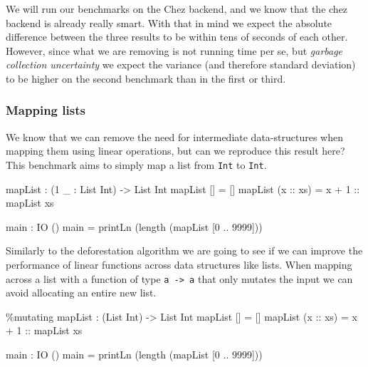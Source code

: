 \documentclass[
]{article}
\newenvironment{Shaded}{}{}
\newcommand{\DataTypeTok}[1]{\textcolor[rgb]{0.56,0.13,0.00}{#1}}
\newcommand{\DecValTok}[1]{\textcolor[rgb]{0.25,0.63,0.44}{#1}}
\newcommand{\FunctionTok}[1]{\textcolor[rgb]{0.02,0.16,0.49}{#1}}
\newcommand{\NormalTok}[1]{#1}
\newcommand{\OperatorTok}[1]{\textcolor[rgb]{0.40,0.40,0.40}{#1}}
\newcommand{\OtherTok}[1]{\textcolor[rgb]{0.00,0.44,0.13}{#1}}
\begin{document}
We will run our benchmarks on the Chez backend, and we know that the
chez backend is already really smart. With that in mind we expect the
absolute difference between the three results to be within tens of
seconds of each other. However, since what we are removing is not
running time per se, but \emph{garbage collection uncertainty} we expect
the variance (and therefore standard deviation) to be higher on the
second benchmark than in the first or third.

\hypertarget{mapping-lists}{%
\subsubsection{Mapping lists}\label{mapping-lists}}

We know that we can remove the need for intermediate data-structures
when mapping them using linear operations\cite{deforestation}, but can
we reproduce this result here? This benchmark aims to simply map a list
from \texttt{Int} to \texttt{Int}.

\begin{Shaded}
\begin{Highlighting}[]
\NormalTok{mapList }\OperatorTok{:}\NormalTok{ (}\DecValTok{1}\NormalTok{ \_ }\OperatorTok{:} \DataTypeTok{List} \DataTypeTok{Int}\NormalTok{) }\OtherTok{{-}\textgreater{}} \DataTypeTok{List} \DataTypeTok{Int}
\NormalTok{mapList [] }\OtherTok{=}\NormalTok{ []}
\NormalTok{mapList (}\OtherTok{x ::}\NormalTok{ xs) }\OtherTok{=}\NormalTok{ x }\OperatorTok{+} \DecValTok{1}\OtherTok{ ::}\NormalTok{ mapList xs}

\NormalTok{main }\OperatorTok{:} \DataTypeTok{IO}\NormalTok{ ()}
\NormalTok{main }\OtherTok{=}\NormalTok{ printLn (}\FunctionTok{length}\NormalTok{ (mapList [}\DecValTok{0} \OperatorTok{..} \DecValTok{9999}\NormalTok{]))}
\end{Highlighting}
\end{Shaded}

Similarly to the deforestation algorithm we are going to see if we can
improve the performance of linear functions across data structures like
lists. When mapping across a list with a function of type
\texttt{a\ -\textgreater{}\ a} that only mutates the input we can avoid
allocating an entire new list.

\begin{Shaded}
\begin{Highlighting}[]
\OperatorTok{\%}\NormalTok{mutating}
\NormalTok{mapList }\OperatorTok{:}\NormalTok{ (}\DataTypeTok{List} \DataTypeTok{Int}\NormalTok{) }\OtherTok{{-}\textgreater{}} \DataTypeTok{List} \DataTypeTok{Int}
\NormalTok{mapList [] }\OtherTok{=}\NormalTok{ []}
\NormalTok{mapList (}\OtherTok{x ::}\NormalTok{ xs) }\OtherTok{=}\NormalTok{ x }\OperatorTok{+} \DecValTok{1}\OtherTok{ ::}\NormalTok{ mapList xs}

\NormalTok{main }\OperatorTok{:} \DataTypeTok{IO}\NormalTok{ ()}
\NormalTok{main }\OtherTok{=}\NormalTok{ printLn (}\FunctionTok{length}\NormalTok{ (mapList [}\DecValTok{0} \OperatorTok{..} \DecValTok{9999}\NormalTok{]))}
\end{Highlighting}
\end{Shaded}
\end{document}
